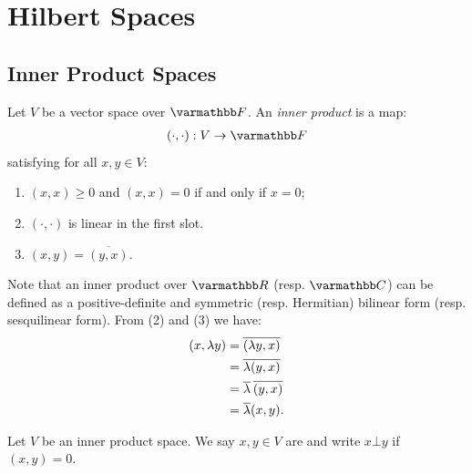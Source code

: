 \chapter{Hilbert Spaces}
\vspace{-25pt}
\section{Inner Product Spaces}

\begin{definition}
Let $V$ be a vector space over $\bfF$. An \textit{inner product} is a map:
    \begin{equation*}
    \begin{split}
        (\cdot,\cdot):V \rightarrow \bfF
    \end{split}
    \end{equation*}
satisfying for all $x,y \in V$:
    \begin{enumerate}[label = (\arabic*),itemsep=1pt,topsep=3pt]
        \item $(x,x) \geq 0$ and $(x,x) = 0$ if and only if $x = 0$;
        \item $(\cdot,\cdot)$ is linear in the first slot.
        \item $(x,y) = \overline{(y,x)}$.
    \end{enumerate}
\end{definition}
\begin{remark}
    Note that an inner product over $\bfR$ (resp. $\bfC$) can be defined as a positive-definite and symmetric (resp. Hermitian) bilinear form (resp. sesquilinear form). From (2) and (3) we have:
            \begin{equation*}
            \begin{split}
                (x,\lambda y)
                & = \overline{(\lambda y, x)} \\
                & = \overline{\lambda (y,x)} \\
                & = \overline{\lambda} \h2\overline{(y,x)} \\
                & = \overline{\lambda} (x,y).
            \end{split}
            \end{equation*}
\end{remark}

\begin{definition}
    Let $V$ be an inner product space. We say $x,y \in V$ are  and write $x \bot y$ if $(x,y) = 0$. 
\end{definition}

